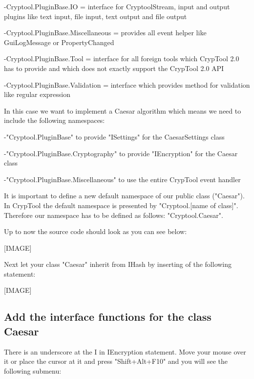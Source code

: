 \hspace{20pt}-Cryptool.PluginBase.IO = interface for CryptoolStream, input and output plugins like text input, file input, text output and file output

\hspace{20pt}-Cryptool.PluginBase.Miscellaneous = provides all event helper like GuiLogMessage or PropertyChanged

\hspace{20pt}-Cryptool.PluginBase.Tool = interface for all foreign tools which CrypTool 2.0 has to provide and which does not exactly support the CrypTool 2.0 API

\hspace{20pt}-Cryptool.PluginBase.Validation = interface which provides method for validation like regular expression

In this case we want to implement a Caesar algorithm which means we need to include the following namespaces:

\hspace{20pt}-"Cryptool.PluginBase" to provide "ISettings" for the CaesarSettings class

\hspace{20pt}-"Cryptool.PluginBase.Cryptography" to provide "IEncryption" for the Caesar class

\hspace{20pt}-"Cryptool.PluginBase.Miscellaneous" to use the entire CrypTool event handler

It is important to define a new default namespace of our public class ("Caesar"). In CrypTool the default namespace is presented by "Cryptool.[name of class]". Therefore our namespace has to be defined as follows: "Cryptool.Caesar".

Up to now the source code should look as you can see below:

[IMAGE]

Next let your class "Caesar" inherit from IHash by inserting of the following statement:

[IMAGE]

\subsection{Add the interface functions for the class Caesar}\label{sec:AddTheInterfaceFunctionsForTheClassMD5}
There is an underscore at the I in IEncryption statement. Move your mouse over it or place the cursor at it and press "Shift+Alt+F10" and you will see the following submenu:

